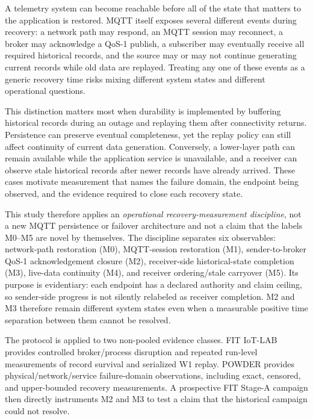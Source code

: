 \documentclass[journal]{IEEEtran}
\begin{document}
A telemetry system can become reachable before all of the state that matters to the application is restored. MQTT itself exposes several different events during recovery: a network path may respond, an MQTT session may reconnect, a broker may acknowledge a QoS-1 publish, a subscriber may eventually receive all required historical records, and the source may or may not continue generating current records while old data are replayed. Treating any one of these events as a generic recovery time risks mixing different system states and different operational questions.

This distinction matters most when durability is implemented by buffering historical records during an outage and replaying them after connectivity returns. Persistence can preserve eventual completeness, yet the replay policy can still affect continuity of current data generation. Conversely, a lower-layer path can remain available while the application service is unavailable, and a receiver can observe stale historical records after newer records have already arrived. These cases motivate measurement that names the failure domain, the endpoint being observed, and the evidence required to close each recovery state.

This study therefore applies an \emph{operational recovery-measurement discipline}, not a new MQTT persistence or failover architecture and not a claim that the labels M0--M5 are novel by themselves. The discipline separates six observables: network-path restoration (M0), MQTT-session restoration (M1), sender-to-broker QoS-1 acknowledgement closure (M2), receiver-side historical-state completion (M3), live-data continuity (M4), and receiver ordering/stale carryover (M5). Its purpose is evidentiary: each endpoint has a declared authority and claim ceiling, so sender-side progress is not silently relabeled as receiver completion. M2 and M3 therefore remain different system states even when a measurable positive time separation between them cannot be resolved.

The protocol is applied to two non-pooled evidence classes. FIT IoT-LAB provides controlled broker/process disruption and repeated run-level measurements of record survival and serialized W1 replay. POWDER provides physical/network/service failure-domain observations, including exact, censored, and upper-bounded recovery measurements. A prospective FIT Stage-A campaign then directly instruments M2 and M3 to test a claim that the historical campaign could not resolve.
\end{document}
